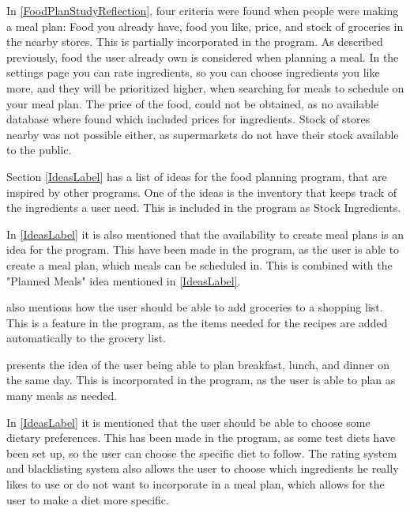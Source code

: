 In \cref{FoodPlanStudyReflection}, four criteria were found when people were making a meal plan: Food you already have, food you like, price, and stock of groceries in the nearby stores. This is partially incorporated in the program. As described previously, food the user already own is considered when planning a meal. In the settings page you can rate ingredients, so you can choose ingredients you like more, and they will be prioritized higher, when searching for meals to schedule on your meal plan. The price of the food, could not be obtained, as no available database where found which included prices for ingredients. Stock of stores nearby was not possible either, as supermarkets do not have their stock available to the public.

Section \ref{IdeasLabel} has a list of ideas for the food planning program, that are inspired by other programs. One of the ideas is the inventory that keeps track of the ingredients a user need. This is included in the program as Stock Ingredients. 

In \cref{IdeasLabel} it is also mentioned that the availability to create meal plans is an idea for the program. This have been made in the program, as the user is able to create a meal plan, which meals can be scheduled in. This is combined with the "Planned Meals" idea mentioned in \cref{IdeasLabel}.

 also mentions how the user should be able to add groceries to a shopping list. This is a feature in the program, as the items needed for the recipes are added automatically to the grocery list.

 presents the idea of the user being able to plan breakfast, lunch, and dinner on the same day. This is incorporated in the program, as the user is able to plan as many meals as needed.

In \cref{IdeasLabel} it is mentioned that the user should be able to choose some dietary preferences. This has been made in the program, as some test diets have been set up, so the user can choose the specific diet to follow. The rating system and blacklisting system also allows the user to choose which ingredients he really likes to use or do not want to incorporate in a meal plan, which allows for the user to make a diet more specific.